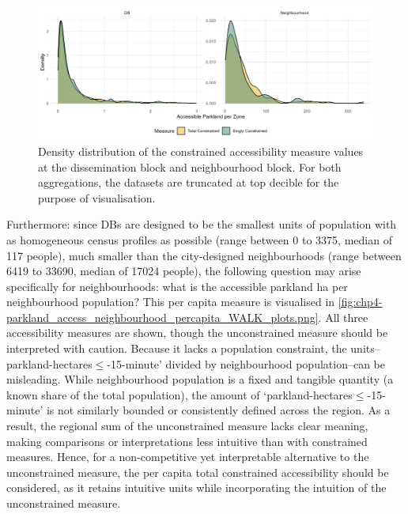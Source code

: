 \documentclass[
11pt, %
oneside, %
english, %
singlespacing, %
]{macthesis} %
\begin{document}
\begin{figure}

{\centering \includegraphics[width=6in]{./data/figures/chp4-dist_db_vs_neigh_plots} 

}

\caption{\label{fig:chp4-dist_db_vs_neigh_plots}Density distribution of the constrained accessibility measure values at the dissemination block and neighbourhood block. For both aggregations, the datasets are truncated at top decible for the purpose of visualisation.}\label{fig:unnamed-chunk-60}
\end{figure}

Furthermore: since DBs are designed to be the smallest units of population with as homogeneous census profiles as possible (range between 0 to 3375, median of 117 people), much smaller than the city-designed neighbourhoods (range between 6419 to 33690, median of 17024 people), the following question may arise specifically for neighbourhoods: what is the accessible parkland ha per neighbourhood population? This per capita measure is visualised in \ref{fig:chp4-parkland_access_neighbourhood_percapita_WALK_plots.png}. All three accessibility measures are shown, though the unconstrained measure should be interpreted with caution. Because it lacks a population constraint, the units--parkland-hectares\(\le\)-15-minute' divided by neighbourhood population--can be misleading. While neighbourhood population is a fixed and tangible quantity (a known share of the total population), the amount of `parkland-hectares\(\le\)-15-minute' is not similarly bounded or consistently defined across the region. As a result, the regional sum of the unconstrained measure lacks clear meaning, making comparisons or interpretations less intuitive than with constrained measures. Hence, for a non-competitive yet interpretable alternative to the unconstrained measure, the per capita total constrained accessibility should be considered, as it retains intuitive units while incorporating the intuition of the unconstrained measure.
\end{document}
